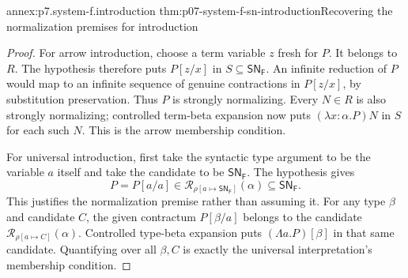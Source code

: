 \begin{annexitem}{annex:p7.system-f.introduction}
 {thm:p07-system-f-sn-introduction}{Recovering the normalization premises for introduction}
\begin{proof}
For arrow introduction, choose a term variable \(z\) fresh for \(P\).
It belongs to \(R\). The hypothesis therefore puts \(P[z/x]\) in
\(S\subseteq\mathsf{SN}_{\mathsf F}\). An infinite reduction of
\(P\) would map to an infinite sequence of genuine contractions in
\(P[z/x]\), by substitution preservation. Thus \(P\) is strongly
normalizing. Every \(N\in R\) is also strongly normalizing; controlled
term-beta expansion now puts \((\lambda x{:}\alpha.P)N\) in \(S\)
for each such \(N\). This is the arrow membership condition.

For universal introduction, first take the syntactic type argument to be
the variable \(a\) itself and take the candidate to be
\(\mathsf{SN}_{\mathsf F}\). The hypothesis gives
\[
 P=P[a/a]\in
 \mathcal R_{\rho[a\mapsto\mathsf{SN}_{\mathsf F}]}(\alpha)
 \subseteq\mathsf{SN}_{\mathsf F}.
\]
This justifies the normalization premise rather than assuming it.
For any type \(\beta\) and candidate \(C\), the given contractum
\(P[\beta/a]\) belongs to the candidate
\(\mathcal R_{\rho[a\mapsto C]}(\alpha)\). Controlled type-beta
expansion puts \((\Lambda a.P)[\beta]\) in that same candidate.
Quantifying over all \(\beta,C\) is exactly the universal
interpretation's membership condition.
\end{proof}
\end{annexitem}

